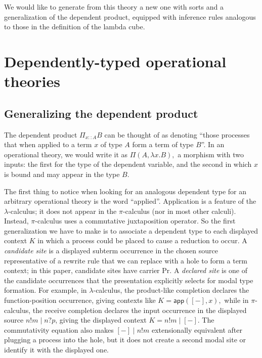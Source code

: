 \documentclass[11pt]{article}
\newcommand{\Proc}{\mathrm{Pr}}
\newcommand{\dep}{\mathsf{\Pi}}
\newcommand{\app}{\mathsf{app}}
\begin{document}
We would like to generate from this theory a new one with sorts and a generalization of the dependent product, equipped with inference rules analogous to those in the definition of the lambda cube.


\section{Dependently-typed operational theories}
\subsection{Generalizing the dependent product}
The dependent product $\Pi_{x::A}B$ can be thought of as denoting ``those processes that when applied to a term $x$ of type $A$ form a term of type $B$''.  In an operational theory, we would write it as $\dep(A, \lambda x.B),$ a morphism with two inputs: the first for the type of the dependent variable, and the second in which $x$ is bound and may appear in the type $B.$

The first thing to notice when looking for an analogous dependent type for an arbitrary operational theory is the word ``applied''.  Application is a feature of the $\lambda$-calculus; it does not appear in the $\pi$-calculus (nor in most other calculi).  Instead, $\pi$-calculus uses a commutative juxtaposition operator.  So the first generalization we have to make is to associate a dependent type to each displayed context $K$ in which a process could be placed to cause a reduction to occur.  A {\em candidate site} is a displayed subterm occurrence in the chosen source representative of a rewrite rule that we can replace with a hole to form a term context; in this paper, candidate sites have carrier $\Proc.$  A {\em declared site} is one of the candidate occurrences that the presentation explicitly selects for modal type formation.  For example, in $\lambda$-calculus, the product-like completion declares the function-position occurrence, giving contexts like $K=\app([-], x),$ while in $\pi$-calculus, the receive completion declares the input occurrence in the displayed source \(n!m\mid n?p\), giving the displayed context \(K=n!m\mid[-]\). The commutativity equation also makes \([-]\mid n!m\) extensionally equivalent after plugging a process into the hole, but it does not create a second modal site or identify it with the displayed one.
\end{document}
